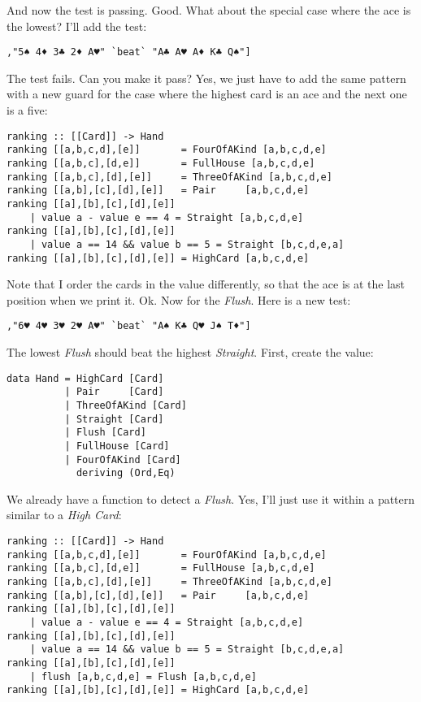 \success And now the test is passing.
\lhN Good. What about the special case where the ace is the lowest? I'll add the test:
\begin{lstlisting}[frame=single]
       ,"5♠ 4♦ 3♣ 2♦ A♥" `beat` "A♣ A♥ A♦ K♣ Q♠"]
\end{lstlisting}
\failure The test fails. Can you make it pass?
\lhA \failure Yes, we just have to add the same pattern with a new guard for the case where the highest card is an ace and the next one is a five:
\begin{lstlisting}[frame=single]
ranking :: [[Card]] -> Hand
ranking [[a,b,c,d],[e]]       = FourOfAKind [a,b,c,d,e]
ranking [[a,b,c],[d,e]]       = FullHouse [a,b,c,d,e]
ranking [[a,b,c],[d],[e]]     = ThreeOfAKind [a,b,c,d,e]
ranking [[a,b],[c],[d],[e]]   = Pair     [a,b,c,d,e]
ranking [[a],[b],[c],[d],[e]] 
    | value a - value e == 4 = Straight [a,b,c,d,e] 
ranking [[a],[b],[c],[d],[e]] 
    | value a == 14 && value b == 5 = Straight [b,c,d,e,a] 
ranking [[a],[b],[c],[d],[e]] = HighCard [a,b,c,d,e] 
\end{lstlisting}
\success Note that I order the cards in the value differently, so that the ace is at the last position when we print it.
\lhN Ok. Now for the \emph{Flush}. Here is a new test:
\begin{lstlisting}[frame=single]
       ,"6♥ 4♥ 3♥ 2♥ A♥" `beat` "A♠ K♣ Q♥ J♠ T♦"]
\end{lstlisting}
\failure The lowest \emph{Flush} should beat the highest \emph{Straight}.
\lhA First, create the value:
\begin{lstlisting}[frame=single]
data Hand = HighCard [Card]
          | Pair     [Card]
          | ThreeOfAKind [Card]
          | Straight [Card]
          | Flush [Card]
          | FullHouse [Card]
          | FourOfAKind [Card]
            deriving (Ord,Eq)
\end{lstlisting}
\lhN We already have a function to detect a \emph{Flush}.
\lhA \failure Yes, I'll just use it within a pattern similar to a \emph{High Card}:
\begin{lstlisting}[frame=single]
ranking :: [[Card]] -> Hand
ranking [[a,b,c,d],[e]]       = FourOfAKind [a,b,c,d,e]
ranking [[a,b,c],[d,e]]       = FullHouse [a,b,c,d,e]
ranking [[a,b,c],[d],[e]]     = ThreeOfAKind [a,b,c,d,e]
ranking [[a,b],[c],[d],[e]]   = Pair     [a,b,c,d,e]
ranking [[a],[b],[c],[d],[e]] 
    | value a - value e == 4 = Straight [a,b,c,d,e] 
ranking [[a],[b],[c],[d],[e]] 
    | value a == 14 && value b == 5 = Straight [b,c,d,e,a] 
ranking [[a],[b],[c],[d],[e]] 
    | flush [a,b,c,d,e] = Flush [a,b,c,d,e] 
ranking [[a],[b],[c],[d],[e]] = HighCard [a,b,c,d,e] 
\end{lstlisting}
